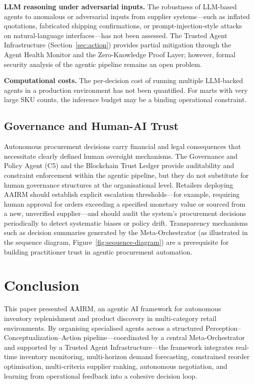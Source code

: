 \documentclass[utf8]{FrontiersinHarvard}
\begin{document}
	\textbf{LLM reasoning under adversarial inputs.}  The robustness of
	LLM-based agents to anomalous or adversarial inputs from supplier
	systems---such as inflated quotations, fabricated shipping confirmations,
	or prompt-injection-style attacks on natural-language interfaces---has not
	been assessed.  The Trusted Agent Infrastructure
	(Section~\ref{sec:action}) provides partial mitigation through the Agent
	Health Monitor and the Zero-Knowledge Proof Layer; however, formal security
	analysis of the agentic pipeline remains an open problem.

	\textbf{Computational costs.}  The per-decision cost of running multiple
	LLM-backed agents in a production environment has not been quantified.  For
	marts with very large SKU counts, the inference budget may be a binding
	operational constraint.

	\subsection{Governance and Human-AI Trust}

	Autonomous procurement decisions carry financial and legal consequences that
	necessitate clearly defined human oversight mechanisms.  The Governance and
	Policy Agent (C5) and the Blockchain Trust Ledger provide auditability and
	constraint enforcement within the agentic pipeline, but they do not
	substitute for human governance structures at the organisational level.
	Retailers deploying AAIRM should establish explicit escalation
	thresholds---for example, requiring human approval for orders exceeding a
	specified monetary value or sourced from a new, unverified supplier---and
	should audit the system's procurement decisions periodically to detect
	systematic biases or policy drift.  Transparency mechanisms such as decision
	summaries generated by the Meta-Orchestrator (as illustrated in the sequence
	diagram, Figure~\ref{fig:sequence-diagram}) are a prerequisite for building
	practitioner trust in agentic procurement automation.

	\section{Conclusion}
	\label{sec:conclusion}

	This paper presented AAIRM, an agentic AI framework for autonomous inventory
	replenishment and product discovery in multi-category retail environments.
	By organising specialised agents across a structured
	Perception--Conceptualization--Action pipeline---coordinated by a central
	Meta-Orchestrator and supported by a Trusted Agent Infrastructure---the
	framework integrates real-time inventory monitoring, multi-horizon demand
	forecasting, constrained reorder optimisation, multi-criteria supplier
	ranking, autonomous negotiation, and learning from operational feedback into
	a cohesive decision loop.
\end{document}
